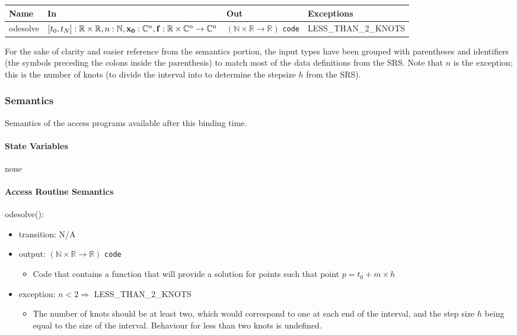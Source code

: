 \documentclass[12pt, titlepage]{article}
\begin{document}
\begin{center}
  \begin{tabular}{p{1.6cm} p{5.8cm} p{3.2cm} p{4.2cm}}
    \hline
    \textbf{Name} & \textbf{In} & \textbf{Out} & \textbf{Exceptions} \\
    \hline
    odesolve &
    $ [t_0,t_N] : \mathbb{R} \times \mathbb{R} , n : \mathbb{N} , 
    {\bf x_0} : \mathbb{C}^n , {\bf f} : \mathbb{R} \times \mathbb{C}^n 
    \rightarrow \mathbb{C}^n $ &
    $(\mathbb{N} \times \mathbb{R} \rightarrow \mathbb{R})$ \texttt{code} & 
    LESS\_THAN\_2\_KNOTS \\
    \hline
  \end{tabular}
\end{center}
For the sake of clarity and easier reference from the semantics portion, the 
input types have been grouped with parentheses and identifiers (the symbols 
preceding the colons inside the parenthesis) to match 
most of the data definitions from the SRS. Note that $n$ is 
the exception; this is the number of knots (to divide the interval into to 
determine the stepsize $h$ from the SRS).
\subsubsection{Semantics}
Semantics of the access programs available after this binding time.
\paragraph{State Variables}

none

\paragraph{Access Routine Semantics}

\noindent odesolve():
\begin{itemize}
  \item transition: N/A
  \item output: $(\mathbb{N} \times \mathbb{R} \rightarrow \mathbb{R})$ 
  \texttt{code}
  \begin{itemize}
    \item Code that contains a function that will provide a solution for points 
    such that point $p = t_0 + m \times h$
  \end{itemize}
  \item exception: $n < 2 \Rightarrow$ LESS\_THAN\_2\_KNOTS
  \begin{itemize}
    \item The number of knots should be at least two, which would correspond to 
    one at each end of the interval, and the step size $h$ being equal to the 
    size of the interval. Behaviour for less than two knots is undefined.
  \end{itemize}
\end{itemize}
\end{document}
